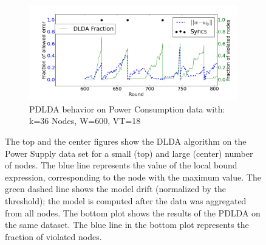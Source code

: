 \begin{figure}
    \begin{subfigure}[b]{0.8\textwidth}
        \includegraphics[width=\textwidth]{graphics/LDA/36nodesProb.png}
        \caption{PDLDA behavior on Power Consumption data with: k=36 Nodes, W=600, VT=18}
    \end{subfigure}
    \caption{The top and the center figures show the DLDA algorithm on the Power Supply data set for a small (top) and large (center) number of nodes. The blue line represents the value of the local bound expression, corresponding to the node with the maximum value. The green dashed line shows the model drift (normalized by the threshold); the model is computed after the data was aggregated from all nodes. The bottom plot shows the results of the PDLDA on the same dataset. The blue line in the bottom plot represents the fraction of violated nodes.}\label{PowerSupplyFigures}
\end{figure}

